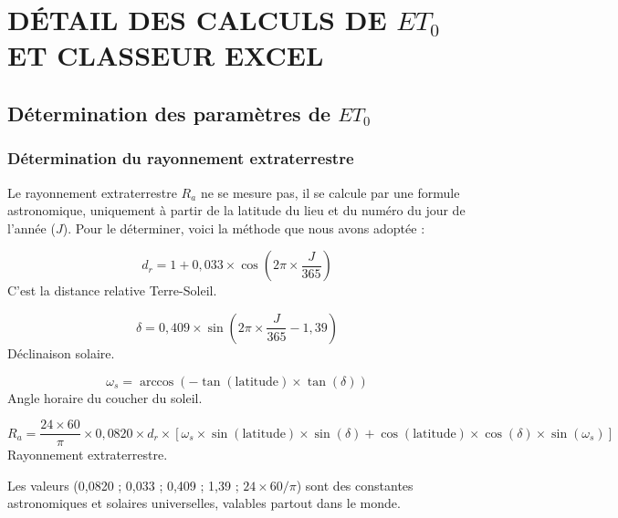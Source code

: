\chapter{DÉTAIL DES CALCULS DE \texorpdfstring{$ET_0$}{ET0} ET CLASSEUR EXCEL}
\label{ann:et0}

\section{Détermination des paramètres de \texorpdfstring{$ET_0$}{ET0}}

\subsection{Détermination du rayonnement extraterrestre}

Le rayonnement extraterrestre $R_a$ ne se mesure pas, il se calcule par une formule astronomique, uniquement à partir de la latitude du lieu et du numéro du jour de l'année ($J$). Pour le déterminer, voici la méthode que nous avons adoptée \cite[chap.~3]{allen_crop_1998-1} :

\begin{equation}
    d_r = 1 + 0{,}033 \times \cos\left(2\pi \times \frac{J}{365}\right)
    \label{eq:dr}
\end{equation}
\noindent C'est la distance relative Terre-Soleil.

\begin{equation}
    \delta = 0{,}409 \times \sin\left(2\pi \times \frac{J}{365} - 1{,}39\right)
    \label{eq:declinaison}
\end{equation}
\noindent Déclinaison solaire.

\begin{equation}
    \omega_s = \arccos\left(-\tan(\text{latitude}) \times \tan(\delta)\right)
    \label{eq:angle_horaire}
\end{equation}
\noindent Angle horaire du coucher du soleil.

\begin{equation}
    R_a = \frac{24 \times 60}{\pi} \times 0{,}0820 \times d_r \times \left[\omega_s \times \sin(\text{latitude}) \times \sin(\delta) + \cos(\text{latitude}) \times \cos(\delta) \times \sin(\omega_s)\right]
    \label{eq:ra}
\end{equation}
\noindent Rayonnement extraterrestre.

Les valeurs (0,0820 ; 0,033 ; 0,409 ; 1,39 ; $24 \times 60/\pi$) sont des constantes astronomiques et solaires universelles, valables partout dans le monde.

